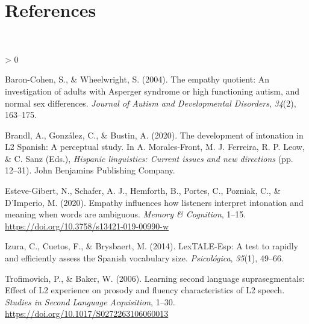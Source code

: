 \documentclass[
  12pt,
]{article}
\newlength{\cslhangindent}
\newenvironment{CSLReferences}[2] %
 {%
  \setlength{\parindent}{0pt}
  \ifodd #1 \everypar{\setlength{\hangindent}{\cslhangindent}}\ignorespaces\fi
  \ifnum #2 > 0
  \setlength{\parskip}{#2\baselineskip}
  \fi
 }%
 {}
\begin{document}
\hypertarget{references}{%
\section{References}\label{references}}

\begingroup
\setlength{\parindent}{-0.5in}
\setlength{\leftskip}{0.5in}

\phantom{.}

\textcolor{white}{\\} \vspace{-0.5in}

\hypertarget{refs}{}
\begin{CSLReferences}{1}{0}
\leavevmode\hypertarget{ref-baron2004empathy}{}%
Baron-Cohen, S., \& Wheelwright, S. (2004). The empathy quotient: An
investigation of adults with {A}sperger syndrome or high functioning
autism, and normal sex differences. \emph{Journal of Autism and
Developmental Disorders}, \emph{34}(2), 163--175.

\leavevmode\hypertarget{ref-bustin_2020}{}%
Brandl, A., González, C., \& Bustin, A. (2020). The development of
intonation in {L}2 {S}panish: {A} perceptual study. In A. Morales-Front,
M. J. Ferreira, R. P. Leow, \& C. Sanz (Eds.), \emph{Hispanic
linguistics: Current issues and new directions} (pp. 12--31). John
Benjamins Publishing Company.

\leavevmode\hypertarget{ref-esteve2020empathy}{}%
Esteve-Gibert, N., Schafer, A. J., Hemforth, B., Portes, C., Pozniak,
C., \& D'Imperio, M. (2020). Empathy influences how listeners interpret
intonation and meaning when words are ambiguous. \emph{Memory \&
Cognition}, 1--15. \url{https://doi.org/10.3758/s13421-019-00990-w}

\leavevmode\hypertarget{ref-izura2014lextale}{}%
Izura, C., Cuetos, F., \& Brysbaert, M. (2014). {LexTALE-Esp}: A test to
rapidly and efficiently assess the {S}panish vocabulary size.
\emph{Psicol{ó}gica}, \emph{35}(1), 49--66.

\leavevmode\hypertarget{ref-trofimovich2006learning}{}%
Trofimovich, P., \& Baker, W. (2006). Learning second language
suprasegmentals: Effect of {L}2 experience on prosody and fluency
characteristics of {L}2 speech. \emph{Studies in Second Language
Acquisition}, 1--30. \url{https://doi.org/10.1017/S0272263106060013}

\end{CSLReferences}

\endgroup
\end{document}

